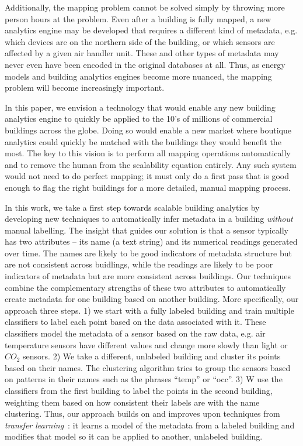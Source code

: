 Additionally, the mapping problem cannot be solved simply by throwing more
person hours at the problem. Even after a building is fully mapped, a new
analytics engine may be developed that requires a different kind of metadata,
e.g. which devices are on the northern side of the building, or which sensors
are affected by a given air handler unit. These and other types of metadata may
never even have been encoded in the original databases at all. Thus, as energy
models and building analytics engines become more nuanced, the mapping problem
will become increasingly important.

In this paper, we envision a technology that would enable any new building
analytics engine to quickly be applied to the 10's of millions of commercial
buildings across the globe. Doing so would enable a new market where boutique
analytics could quickly be matched with the buildings they would benefit the
most. The key to this vision is to perform all mapping operations automatically
and to remove the human from the scalability equation entirely. Any such system
would not need to do perfect mapping; it must only do a first pass that is good
enough to flag the right buildings for a more detailed, manual mapping process.

In this work, we take a first step towards scalable building analytics by
developing new techniques to automatically infer metadata in a building {\em
  without} manual labelling. The insight that guides our solution is that a
sensor typically has two attributes -- its name (a text string) and its
numerical readings generated over time. The names are likely to be good
indicators of metadata structure but are not consistent across buidlings, while
the readings are likely to be poor indicators of metadata but are more
consistent across buildings. Our techniques combine the complementary strengths
of these two attributes to automatically create metadata for one building based
on another building. More specifically, our approach three steps. 1) we start
with a fully labeled building and train multiple classifiers to label each point
based on the data associated with it. These classifiers model the metadata of a
sensor based on the raw data, e.g. air temperature sensors have different values
and change more slowly than light or $CO_2$ sensors. 2) We take a different,
unlabeled building and cluster its points based on their names. The clustering
algorithm tries to group the sensors based on patterns in their names such as
the phrases ``temp'' or ``occ''. 3) W use the classifiers from the first
building to label the points in the second building, weighting them based on how
consistent their labels are with the name clustering. Thus, our approach builds
on and improves upon techniques from {\em transfer learning}~\cite{lwe}: it
learns a model of the metadata from a labeled building and modifies that model
so it can be applied to another, unlabeled building.

